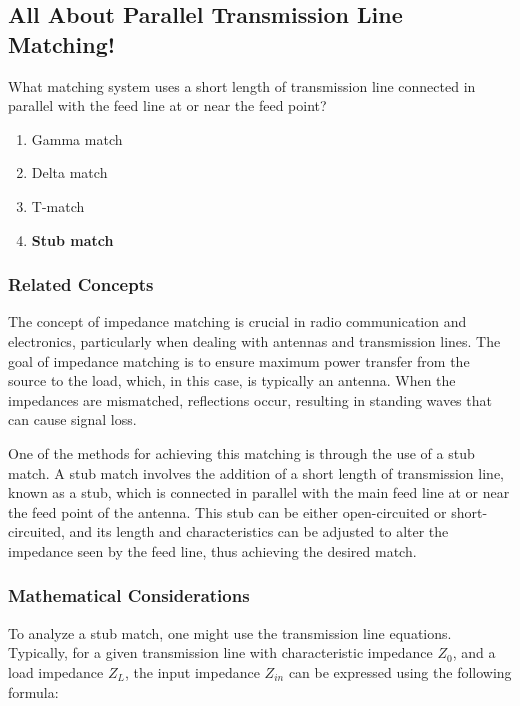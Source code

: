 \subsection{All About Parallel Transmission Line Matching!}

\begin{tcolorbox}[colback=gray!10, colframe=black, title=E9E03] 

What matching system uses a short length of transmission line connected in parallel with the feed line at or near the feed point?

\begin{enumerate}[label=\Alph*.]
    \item Gamma match
    \item Delta match
    \item T-match
    \item \textbf{Stub match}
\end{enumerate} \end{tcolorbox}

\subsubsection{Related Concepts}

The concept of impedance matching is crucial in radio communication and electronics, particularly when dealing with antennas and transmission lines. The goal of impedance matching is to ensure maximum power transfer from the source to the load, which, in this case, is typically an antenna. When the impedances are mismatched, reflections occur, resulting in standing waves that can cause signal loss.

One of the methods for achieving this matching is through the use of a stub match. A stub match involves the addition of a short length of transmission line, known as a stub, which is connected in parallel with the main feed line at or near the feed point of the antenna. This stub can be either open-circuited or short-circuited, and its length and characteristics can be adjusted to alter the impedance seen by the feed line, thus achieving the desired match.

\subsubsection{Mathematical Considerations}

To analyze a stub match, one might use the transmission line equations. Typically, for a given transmission line with characteristic impedance \( Z_0 \), and a load impedance \( Z_L \), the input impedance \( Z_{in} \) can be expressed using the following formula:

